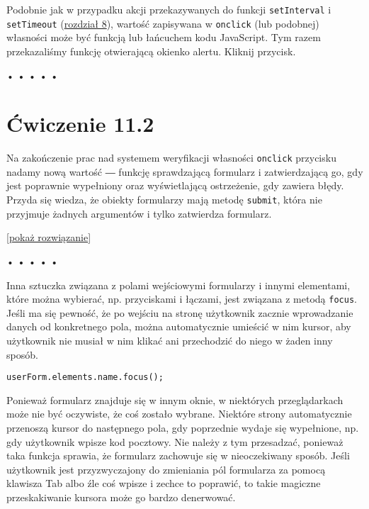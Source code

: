 Podobnie jak w przypadku akcji przekazywanych do funkcji \texttt{setInterval} i \texttt{setTimeout} (\hyperref[chap:8]{rozdział 8}), wartość zapisywana w \texttt{onclick} (lub podobnej) własności może być funkcją lub łańcuchem kodu JavaScript. Tym razem przekazaliśmy funkcję otwierającą okienko alertu. Kliknij przycisk.



\begin{center}
• • • • •
\end{center}

  
\section*{Ćwiczenie 11.2}
\label{sec:11.2}
  
    
Na zakończenie prac nad systemem weryfikacji własności \texttt{onclick} przycisku nadamy nową wartość ― funkcję sprawdzającą formularz i zatwierdzającą go, gdy jest poprawnie wypełniony oraz wyświetlającą ostrzeżenie, gdy zawiera błędy. Przyda się wiedza, że obiekty formularzy mają metodę \texttt{submit}, która nie przyjmuje żadnych argumentów i tylko zatwierdza formularz.

  
[\hyperref[sol:11.2]{pokaż rozwiązanie}]


\begin{center}
• • • • •
\end{center}

  
Inna sztuczka związana z polami wejściowymi formularzy i innymi elementami, które można wybierać, np. przyciskami i łączami, jest związana z metodą \texttt{focus}. Jeśli ma się pewność, że po wejściu na stronę użytkownik zacznie wprowadzanie danych od konkretnego pola, można automatycznie umieścić w nim kursor, aby użytkownik nie musiał w nim klikać ani przechodzić do niego w żaden inny sposób.

  
\begin{verbatim} 
userForm.elements.name.focus();
\end{verbatim}
  
Ponieważ formularz znajduje się w innym oknie, w niektórych przeglądarkach może nie być oczywiste, że coś zostało wybrane. Niektóre strony automatycznie przenoszą kursor do następnego pola, gdy poprzednie wydaje się wypełnione, np. gdy użytkownik wpisze kod pocztowy. Nie należy z tym przesadzać, ponieważ taka funkcja sprawia, że formularz zachowuje się w nieoczekiwany sposób. Jeśli użytkownik jest przyzwyczajony do zmieniania pól formularza za pomocą klawisza Tab albo źle coś wpisze i zechce to poprawić, to takie magiczne przeskakiwanie kursora może go bardzo denerwować.



